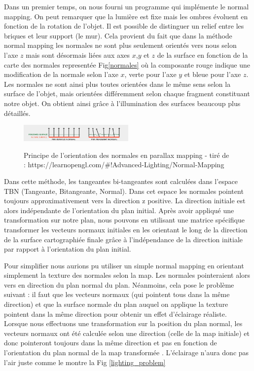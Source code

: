\documentclass[a4paper]{article}
\begin{document}
Dans un premier temps, on nous fourni un programme qui implémente le normal mapping. On peut remarquer que la lumière est fixe mais les ombres évoluent en fonction de la rotation de l'objet. Il est possible de distinguer un relief entre les briques et leur support (le mur). Cela provient du fait que dans la méthode normal mapping les normales ne sont plus seulement orientés vers nous selon l'axe $z$ mais sont désormais liées aux axes $x$,$y$ et $z$ de la surface en fonction de la carte des normales representée Fig\ref{normales} où la composante rouge indique une modification de la normale selon l'axe $x$, verte pour l'axe $y$ et bleue pour l'axe $z$. Les normales ne sont ainsi plus toutes orientées dans le même sens selon la surface de l'objet, mais orientées différemment selon chaque fragment constituant notre objet. On obtient ainsi grâce à l'illumination des surfaces beaucoup plus détaillés.

\begin{figure}[H]
\centering
\includegraphics[width=0.5\textwidth]{figures/normalsOrientation.png}\label{normalOrientation}
\caption{Principe de l'orientation des normales en parallax mapping - tiré de :  https://learnopengl.com/\#!Advanced-Lighting/Normal-Mapping}
\end{figure}



Dans cette méthode, les tangeantes bi-tangeantes sont calculées dans l'espace TBN (Tangeante, Bitangeante, Normal). Dans cet espace les normales pointent toujours approximativement vers la direction z positive. La direction initiale est alors indépendante de l'orientation du plan initial. Après avoir appliqué une transformation sur notre plan, nous pouvons en utilisant une matrice spécifique transformer les vecteurs normaux initiales en les orientant le long de la direction de la surface cartographiée finale grâce à l'indépendance de la direction initiale par rapport à l'orientation du plan initial.

Pour simplifier nous aurions pu utiliser un simple normal mapping en orientant simplement la texture des normales selon la map. Les normales pointeraient alors vers en direction du plan normal du plan. Néanmoins, cela pose le problème suivant : il faut que les vecteurs normaux (qui pointent tous dans la même direction) et que la surface normale du plan auquel on applique la texture pointent dans la même direction pour obtenir un effet d'éclairage réaliste. Lorsque nous effectuons une transformation sur la position du plan normal, les vecteurs normaux ont été calculée selon une direction (celle de la map initiale) et donc pointeront toujours dans la même direction et pas en fonction de l'orientation du plan normal de la map transformée . L'éclairage n'aura donc pas l'air juste comme le montre la Fig \ref{lighting_problem}
\end{document}
